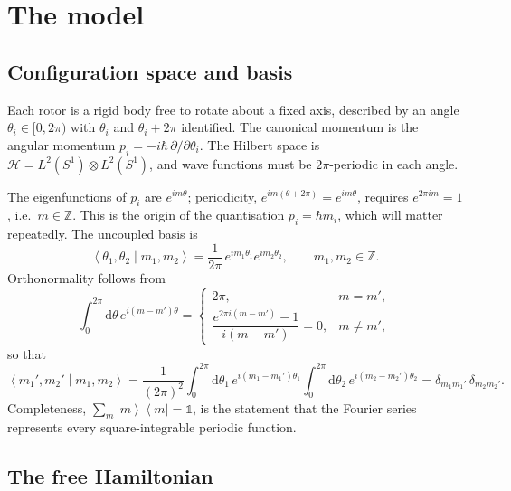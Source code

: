 \documentclass[preprint,12pt]{elsarticle}
\newcommand{\ket}[1]{\left|#1\right\rangle}
\newcommand{\bra}[1]{\left\langle#1\right|}
\newcommand{\braket}[2]{\left\langle#1\middle|#2\right\rangle}
\newcommand{\dd}{\mathrm{d}}
\begin{document}
\section{The model}
\label{sec:model}

\subsection{Configuration space and basis}

Each rotor is a rigid body free to rotate about a fixed axis, described by an
angle $\theta_{i}\in[0,2\pi)$ with $\theta_{i}$ and $\theta_{i}+2\pi$
identified. The canonical momentum is the angular momentum
$p_{i}=-i\hbar\,\partial/\partial\theta_{i}$. The Hilbert space is
$\mathcal{H}=L^{2}(S^{1})\otimes L^{2}(S^{1})$, and wave functions must be
$2\pi$-periodic in each angle.

The eigenfunctions of $p_{i}$ are $e^{im\theta}$; periodicity,
$e^{im(\theta+2\pi)}=e^{im\theta}$, requires $e^{2\pi im}=1$, i.e.\
$m\in\mathbb{Z}$. This is the origin of the quantisation $p_{i}=\hbar m_{i}$,
which will matter repeatedly. The uncoupled basis is
\begin{equation}
\braket{\theta_{1},\theta_{2}}{m_{1},m_{2}}
=\frac{1}{2\pi}\,e^{im_{1}\theta_{1}}e^{im_{2}\theta_{2}},
\qquad m_{1},m_{2}\in\mathbb{Z}.
\label{eq:basis}
\end{equation}
Orthonormality follows from
\begin{equation}
\int_{0}^{2\pi}\dd\theta\,e^{i(m-m')\theta}
=\begin{cases}2\pi, & m=m',\\[2pt]
\dfrac{e^{2\pi i(m-m')}-1}{i(m-m')}=0, & m\neq m',\end{cases}
\label{eq:ortho1}
\end{equation}
so that
\begin{equation}
\braket{m_{1}',m_{2}'}{m_{1},m_{2}}
=\frac{1}{(2\pi)^{2}}\int_{0}^{2\pi}\!\dd\theta_{1}\,e^{i(m_{1}-m_{1}')\theta_{1}}
\int_{0}^{2\pi}\!\dd\theta_{2}\,e^{i(m_{2}-m_{2}')\theta_{2}}
=\delta_{m_{1}m_{1}'}\,\delta_{m_{2}m_{2}'}.
\label{eq:ortho}
\end{equation}
Completeness, $\sum_{m}\ket{m}\bra{m}=\mathbb{1}$, is the statement that the
Fourier series represents every square-integrable periodic function.

\subsection{The free Hamiltonian}
\end{document}
